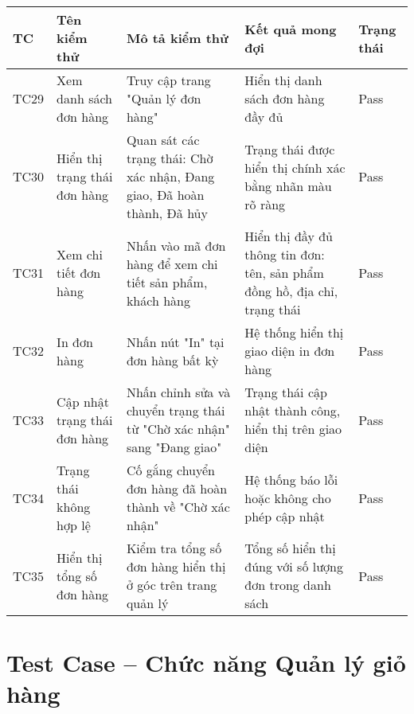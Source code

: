 \begin{longtable}{|p{1cm}|p{3cm}|p{4cm}|p{3cm}|p{2cm}|}
\hline
\textbf{TC} & \textbf{Tên kiểm thử} & \textbf{Mô tả kiểm thử} & \textbf{Kết quả mong đợi} & \textbf{Trạng thái} \\
\hline
TC29 & Xem danh sách đơn hàng & Truy cập trang "Quản lý đơn hàng" & Hiển thị danh sách đơn hàng đầy đủ & Pass \\
\hline
TC30 & Hiển thị trạng thái đơn hàng & Quan sát các trạng thái: Chờ xác nhận, Đang giao, Đã hoàn thành, Đã hủy & Trạng thái được hiển thị chính xác bằng nhãn màu rõ ràng & Pass \\
\hline
TC31 & Xem chi tiết đơn hàng & Nhấn vào mã đơn hàng để xem chi tiết sản phẩm, khách hàng & Hiển thị đầy đủ thông tin đơn: tên, sản phẩm đồng hồ, địa chỉ, trạng thái & Pass \\
\hline
TC32 & In đơn hàng & Nhấn nút "In" tại đơn hàng bất kỳ & Hệ thống hiển thị giao diện in đơn hàng & Pass \\
\hline
TC33 & Cập nhật trạng thái đơn hàng & Nhấn chỉnh sửa và chuyển trạng thái từ "Chờ xác nhận" sang "Đang giao" & Trạng thái cập nhật thành công, hiển thị trên giao diện & Pass \\
\hline
TC34 & Trạng thái không hợp lệ & Cố gắng chuyển đơn hàng đã hoàn thành về "Chờ xác nhận" & Hệ thống báo lỗi hoặc không cho phép cập nhật & Pass \\
\hline
TC35 & Hiển thị tổng số đơn hàng & Kiểm tra tổng số đơn hàng hiển thị ở góc trên trang quản lý & Tổng số hiển thị đúng với số lượng đơn trong danh sách & Pass \\
\hline
\end{longtable}

\section*{Test Case – Chức năng Quản lý giỏ hàng}

